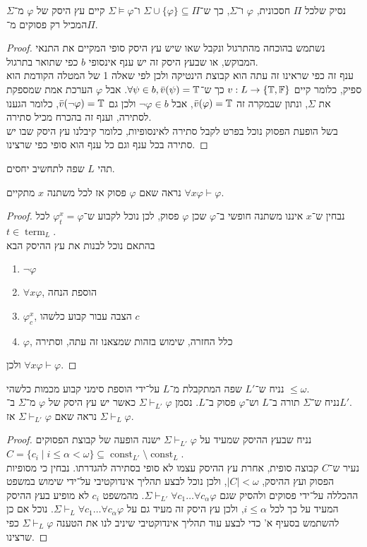 \subquestion{}
נסיק שלכל $\Pi$ חסכונית, $\varphi$ ו־$\Sigma$, כך ש־$\Sigma \cup \{ \varphi \} \subseteq \Pi$ ו־$\Sigma \models \varphi$ קיים עץ היסק של $\varphi$ מ־$\Sigma$ המכיל רק פסוקים מ־$\Pi$.
\begin{proof}
	נשתמש בהוכחה מהתרגול ונקבל שאו שיש עץ היסק סופי המקיים את התנאי המבוקש, או שבעץ היסק זה יש ענף אינסופי $b$ כפי שתואר בתרגול. \\
	ענף זה כפי שראינו זה עתה הוא קבוצת הינטיקה ולכן לפי שאלה 1 של המטלה הקודמת הוא ספיק, כלומר קיים $v : L \to \{ \mathbb{T}, \mathbb{F} \}$ כך ש־$\forall \psi \in b, \bar{v}(\psi) = \mathbb{T}$.
	אבל $\varphi$ הערכת אמת שמספקת את $\Sigma$, ונתון שבמקרה זה $\bar{v}(\varphi) = \mathbb{T}$, אבל $\lnot \varphi \in b$ ולכן גם $\bar{v}(\lnot \varphi) = \mathbb{T}$, כלומר הגענו לסתירה, וענף זה בהכרח מכיל סתירה. \\
	בשל הופעת הפסוק נוכל בפרט לקבל סתירה לאינסופיות, כלומר קיבלנו עץ היסק שבו יש סתירה בכל ענף וגם כל ענף הוא סופי כפי שרצינו.
\end{proof}

\question{}
תהי $L$ שפה לתחשיב יחסים.

\subquestion{}
נראה שאם $\varphi$ פסוק אז לכל משתנה $x$ מתקיים $\forall x \varphi \vdash \varphi$.
\begin{proof}
	נבחין ש־$x$ איננו משתנה חופשי ב־$\varphi$ שכן $\varphi$ פסוק, לכן נוכל לקבוע ש־$\varphi_t^x = \varphi$ לכל $t \in \operatorname{term}_L$. \\
	בהתאם נוכל לבנות את עץ ההיסק הבא
	\begin{enumerate}
		\item $\lnot \varphi$
		\item $\forall x \varphi$, הוספת הנחה
		\item $\varphi_c^x$, הצבה עבור קבוע כלשהו $c$
		\item $\varphi$, כלל החזרה, שימוש בזהות שמצאנו זה עתה, וסתירה
	\end{enumerate}
	ולכן $\forall x \varphi \vdash \varphi$.
\end{proof}

\subquestion{}
נניח ש־$L'$ שפה המתקבלת מ־$L$ על־ידי הוספת סימני קבוע מכמות כלשהי $\le \omega$. \\
נניח ש־$\Sigma$ תורה ב־$L$ וש־$\varphi$ פסוק ב־$L$.
נסמן $\Sigma \vdash_{L'} \varphi$ כאשר יש עץ היסק של $\varphi$ מ־$\Sigma$ ב־$L'$. \\
נראה שאם $\Sigma \vdash_{L'} \varphi$ אז $\Sigma \vdash_L \varphi$.
\begin{proof}
	נניח שבעץ ההיסק שמעיד על $\Sigma \vdash_{L'} \varphi$ ישנה הופעה של קבוצת הפסוקים $C = \{ c_i \mid i \le \alpha < \omega \} \subseteq \operatorname{const}_{L'} \setminus \operatorname{const}_L$. \\
	נעיר ש־$C$ קבוצה סופית, אחרת עץ ההיסק עצמו לא סופי בסתירה להגדרתו.
	נבחין כי מסופיות הפסוק ועץ ההיסק, $|C| < \omega$, ולכן נוכל לבצע תהליך אינדוקטיבי על־ידי שימוש במשפט ההכללה על־ידי פסוקים ולהסיק שגם $\Sigma \vdash_{L'} \forall c_1 \dots \forall c_\alpha \varphi$.
	מהמשפט $c_i$ לא מופיע בעץ ההיסק המעיד על כך לכל $i \le \alpha$, ולכן עץ היסק זה מעיד גם על $\Sigma \vdash_L \forall c_1 \dots \forall c_\alpha \varphi$.
	נוכל אם כן להשתמש בסעיף א' כדי לבצע עוד תהליך אינדוקטיבי שיניב לנו את הטענה $\Sigma \vdash_L \varphi$ כפי שרצינו.
\end{proof}

